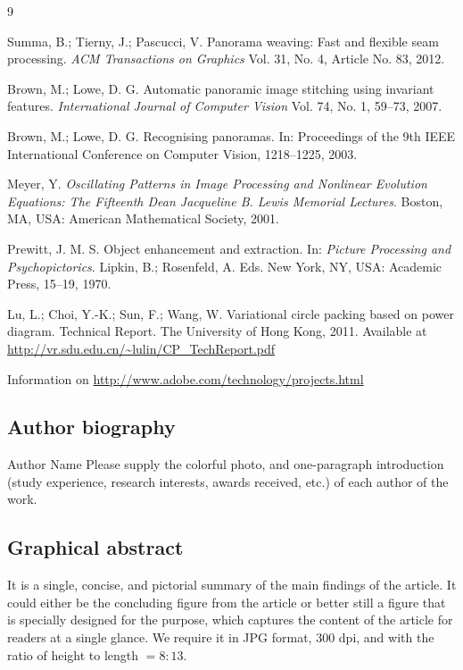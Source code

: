 \documentclass{CVM}
\begin{document}
\begin{thebibliography}{9}

 Summa, B.; Tierny, J.; Pascucci, V. Panorama weaving: Fast and flexible
seam processing. \textit{ACM Transactions on Graphics} Vol. 31, No. 4, Article No. 83, 2012.

 Brown, M.; Lowe, D. G. Automatic panoramic image stitching using
invariant features. \textit{International Journal of Computer Vision} Vol. 74, No. 1, 59--73, 2007.

 Brown, M.; Lowe, D. G. Recognising panoramas. In: Proceedings of the 9th
IEEE International Conference on Computer Vision, 1218--1225, 2003.

 Meyer, Y. \textit{Oscillating Patterns in Image Processing and Nonlinear Evolution Equations: The Fifteenth Dean Jacqueline B. Lewis Memorial Lectures}. Boston, MA, USA: American Mathematical Society, 2001.

 Prewitt, J. M. S. Object enhancement and extraction. In: \textit{Picture Processing and Psychopictorics}. Lipkin, B.;
Rosenfeld, A. Eds. New York, NY, USA: Academic Press, 15--19, 1970.

 Lu, L.; Choi, Y.-K.; Sun, F.; Wang, W. Variational circle packing based
on power diagram. Technical Report. The University of Hong Kong, 2011.
Available at \url{http://vr.sdu.edu.cn/~lulin/CP_TechReport.pdf}

 Information on \url{http://www.adobe.com/technology/projects.html}
\end{thebibliography}

% 
% 

\subsection*{Author biography}

\begin{biography}[author1]{Author Name} Please supply the colorful photo, and one-paragraph introduction (study experience, research interests, awards received, etc.) of each author of the work.
\end{biography}

\vspace*{2.6em}
\subsection*{Graphical abstract}

It is a single, concise, and pictorial summary of the main findings of the article. It could either be the concluding figure from the article or better still a figure that is specially designed for the purpose, which captures the content of the article for readers at a single glance. We require it in JPG format, 300 dpi, and with the ratio of height to length $= 8 : 13$.
\end{document}

